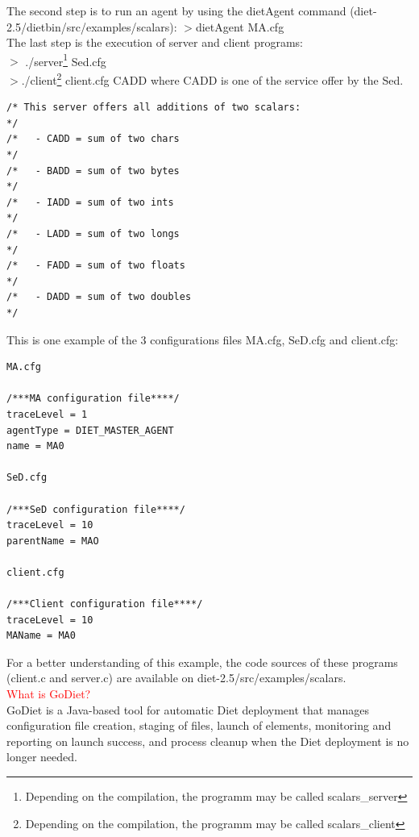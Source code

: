 \documentclass[12pt,a4paper]{book}
\newcommand{\dietversion}{2.5}
\begin{document}
\noindent The second step is to run an agent by using the dietAgent command (diet-\dietversion/dietbin/src/examples/scalars):
$>$dietAgent MA.cfg\\
\noindent The last step is the execution of server and client programs:\\
$>$ ./server\footnote{Depending on the compilation, the programm may be called scalars\_server} Sed.cfg\\
$>$./client\footnote{Depending on the compilation, the programm may be called scalars\_client} client.cfg CADD where CADD is one of the service offer by the Sed.
\begin{verbatim}
/* This server offers all additions of two scalars:                  */
/*   - CADD = sum of two chars                                       */
/*   - BADD = sum of two bytes                                       */
/*   - IADD = sum of two ints                                        */
/*   - LADD = sum of two longs                                       */
/*   - FADD = sum of two floats                                      */
/*   - DADD = sum of two doubles                                     */
\end{verbatim}

\noindent This is one example of the 3 configurations files MA.cfg, SeD.cfg and client.cfg:

\begin{verbatim}
MA.cfg

/***MA configuration file****/
traceLevel = 1
agentType = DIET_MASTER_AGENT
name = MA0

SeD.cfg

/***SeD configuration file****/
traceLevel = 10
parentName = MAO

client.cfg

/***Client configuration file****/
traceLevel = 10
MAName = MA0
\end{verbatim}

\noindent For a better understanding of this example, the code sources of these programs (client.c and server.c) are available on diet-\dietversion/src/examples/scalars.\\

\noindent \textcolor{red}{What is GoDiet?}\\
GoDiet is a Java-based tool for automatic Diet deployment that manages configuration file creation, staging of files, launch of elements, monitoring and reporting on launch
success, and process cleanup when the Diet deployment is no longer needed.\\
\end{document}

